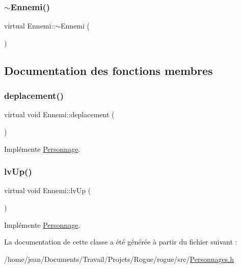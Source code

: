 \subsubsection{\texorpdfstring{$\sim$\+Ennemi()}{~Ennemi()}}
{\footnotesize\ttfamily virtual Ennemi\+::$\sim$\+Ennemi (\begin{DoxyParamCaption}{ }\end{DoxyParamCaption})\hspace{0.3cm}{\ttfamily [virtual]}}



\subsection{Documentation des fonctions membres}
\mbox{\label{classEnnemi_a6d60d6fed98ea6fe501484a693d163a9}} 
\subsubsection{\texorpdfstring{deplacement()}{deplacement()}}
{\footnotesize\ttfamily virtual void Ennemi\+::deplacement (\begin{DoxyParamCaption}{ }\end{DoxyParamCaption})\hspace{0.3cm}{\ttfamily [virtual]}}



Implémente \hyperlink{classPersonnage_afb4a375fa5494eb586b9470d72a46694}{Personnage}.

\mbox{\label{classEnnemi_a36d244231657f4901ed23a7046f614a1}} 
\subsubsection{\texorpdfstring{lv\+Up()}{lvUp()}}
{\footnotesize\ttfamily virtual void Ennemi\+::lv\+Up (\begin{DoxyParamCaption}{ }\end{DoxyParamCaption})\hspace{0.3cm}{\ttfamily [virtual]}}



Implémente \hyperlink{classPersonnage_acdbb926ead0cf6f0b919e72148b02f6d}{Personnage}.



La documentation de cette classe a été générée à partir du fichier suivant \+:\begin{DoxyCompactItemize}
\item 
/home/jean/\+Documents/\+Travail/\+Projets/\+Rogue/rogue/src/\hyperlink{Personnages_8h}{Personnages.\+h}\end{DoxyCompactItemize}
